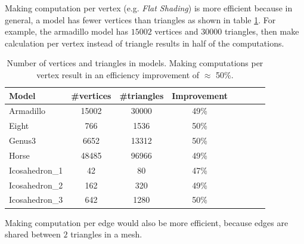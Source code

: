 Making computation per vertex (e.g. \textit{Flat Shading}) is more efficient because in general, a model has fewer vertices than triangles as shown in table \ref{table:model-table-vertices}.
For example, the armadillo model has $15002$ vertices and $30000$ triangles, then make calculation per vertex instead of triangle results in half of the computations.

\begin{table}[!h]
    \centering
\begin{tabular}{l*{6}{c}r}
    \centering
    Model              & \#vertices & \#triangles & Improvement\\
    \hline
    Armadillo          & 15002 & 30000 & 49\%\\
    Eight              & 766 & 1536 & 50\% \\
    Genus3             & 6652 & 13312 & 50\% \\
    Horse              & 48485 &  96966 & 49\%\\
    Icosahedron\_1      &  42 & 80 & 47\%\\
    Icosahedron\_2      &  162 & 320 & 49\% \\
    Icosahedron\_3      & 642 &  1280 & 50\%
\end{tabular}
\caption{Number of vertices and triangles in models. Making computations per vertex result in an efficiency improvement of $\approx$ 50\%.}
\label{table:model-table-vertices}
\end{table}

Making computation per edge would also be more efficient, because edges are shared between $2$ triangles in a mesh.

